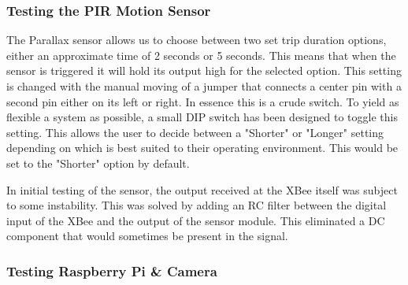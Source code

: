 \subsubsection{Testing the PIR Motion Sensor}
\par The Parallax sensor allows us to choose between two set trip duration options, either an approximate time of 2 seconds or 5 seconds. This means that when the sensor is triggered it will hold its output high for the selected option. This setting is changed with the manual moving of a jumper that connects a center pin with a second pin either on its left or right. In essence this is a crude switch. To yield as flexible a system as possible, a small DIP switch has been designed to toggle this setting. This allows the user to decide between a "Shorter" or "Longer" setting depending on which is best suited to their operating environment. This would be set to the "Shorter" option by default. 
\par In initial testing of the sensor, the output received at the XBee itself was subject to some instability. This was solved by adding an RC filter between the digital input of the XBee and the output of the sensor module. This eliminated a DC component that would sometimes be present in the signal. 

 


\subsubsection{Testing Raspberry Pi \& Camera}
